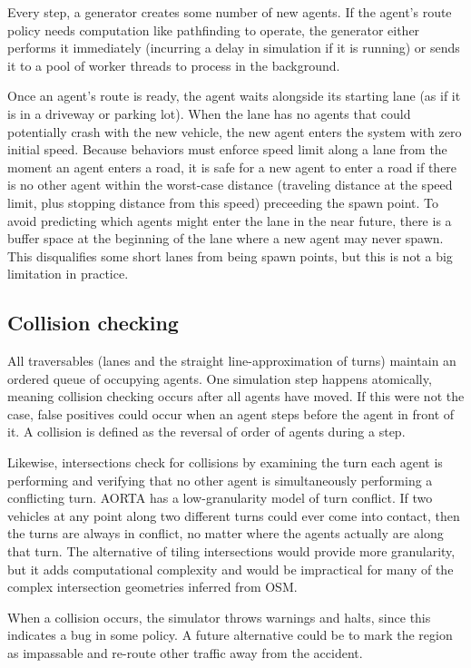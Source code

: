 \documentclass[letterpaper, 10 pt, conference]{ieeeconf}  %
\begin{document}
Every step, a generator creates some number of new agents. If the agent's route
policy needs computation like pathfinding to operate, the generator either
performs it immediately (incurring a delay in simulation if it is running) or
sends it to a pool of worker threads to process in the background.

Once an agent's route is ready, the agent waits alongside its starting lane (as
if it is in a driveway or parking lot). When the lane has no agents that could
potentially crash with the new vehicle, the new agent enters the system with
zero initial speed.  Because behaviors must enforce speed limit along a lane 
from the moment an agent enters a road, it is safe for a new agent to enter a road
if there is no other agent within the worst-case distance (traveling distance at the
speed limit, plus stopping distance from this speed) preceeding the spawn point.
To avoid predicting which agents might enter the lane in the near future, there
is a buffer space at the beginning of the lane where a new agent may never
spawn. This disqualifies some short lanes from being spawn points, but this is
not a big limitation in practice.

\subsection{Collision checking}

All traversables (lanes and the straight line-approximation of turns) maintain
an ordered queue of occupying agents. One simulation step happens atomically,
meaning collision checking occurs after all agents have moved. If this were not
the case, false positives could occur when an agent steps before the agent in front
of it. A collision is defined as the reversal of order of agents during a step.

Likewise, intersections check for collisions by examining the turn each agent is
performing and verifying that no other agent is simultaneously performing a
conflicting turn. AORTA has a low-granularity model of turn conflict. If two
vehicles at any point along two different turns could ever come into contact,
then the turns are always in conflict, no matter where the agents actually are
along that turn. The alternative of tiling intersections \cite{JAIR08-dresner}
would provide more granularity, but it adds computational complexity and would
be impractical for many of the complex intersection geometries inferred from
OSM.

When a collision occurs, the simulator throws warnings and halts, since this
indicates a bug in some policy. A future alternative could be to mark the region
as impassable and re-route other traffic away from the accident.
\end{document}
